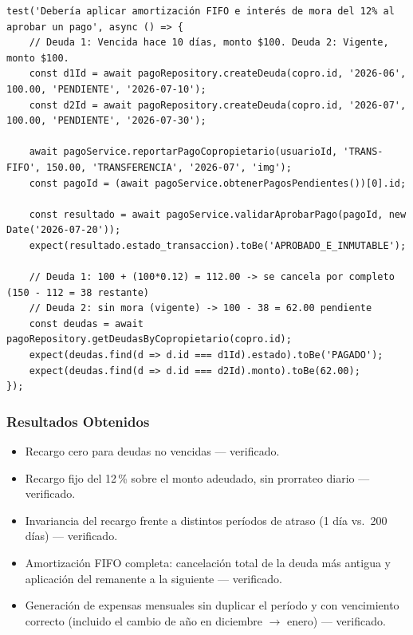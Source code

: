 \documentclass[12pt,a4paper]{article}
\begin{document}
\begin{lstlisting}[caption={Amortización FIFO con recargo del 12\% sobre la deuda vencida (\texttt{PagoService.test.js})}]
test('Debería aplicar amortización FIFO e interés de mora del 12% al aprobar un pago', async () => {
    // Deuda 1: Vencida hace 10 días, monto $100. Deuda 2: Vigente, monto $100.
    const d1Id = await pagoRepository.createDeuda(copro.id, '2026-06', 100.00, 'PENDIENTE', '2026-07-10');
    const d2Id = await pagoRepository.createDeuda(copro.id, '2026-07', 100.00, 'PENDIENTE', '2026-07-30');

    await pagoService.reportarPagoCopropietario(usuarioId, 'TRANS-FIFO', 150.00, 'TRANSFERENCIA', '2026-07', 'img');
    const pagoId = (await pagoService.obtenerPagosPendientes())[0].id;

    const resultado = await pagoService.validarAprobarPago(pagoId, new Date('2026-07-20'));
    expect(resultado.estado_transaccion).toBe('APROBADO_E_INMUTABLE');

    // Deuda 1: 100 + (100*0.12) = 112.00 -> se cancela por completo (150 - 112 = 38 restante)
    // Deuda 2: sin mora (vigente) -> 100 - 38 = 62.00 pendiente
    const deudas = await pagoRepository.getDeudasByCopropietario(copro.id);
    expect(deudas.find(d => d.id === d1Id).estado).toBe('PAGADO');
    expect(deudas.find(d => d.id === d2Id).monto).toBe(62.00);
});
\end{lstlisting}

\subsubsection*{Resultados Obtenidos}
\begin{itemize}[nosep]
    \item Recargo cero para deudas no vencidas — verificado.
    \item Recargo fijo del 12\,\% sobre el monto adeudado, sin prorrateo diario — verificado.
    \item Invariancia del recargo frente a distintos períodos de atraso (1 día vs.\ 200
    días) — verificado.
    \item Amortización FIFO completa: cancelación total de la deuda más antigua y aplicación
    del remanente a la siguiente — verificado.
    \item Generación de expensas mensuales sin duplicar el período y con vencimiento
    correcto (incluido el cambio de año en diciembre $\rightarrow$ enero) — verificado.
\end{itemize}
\end{document}
